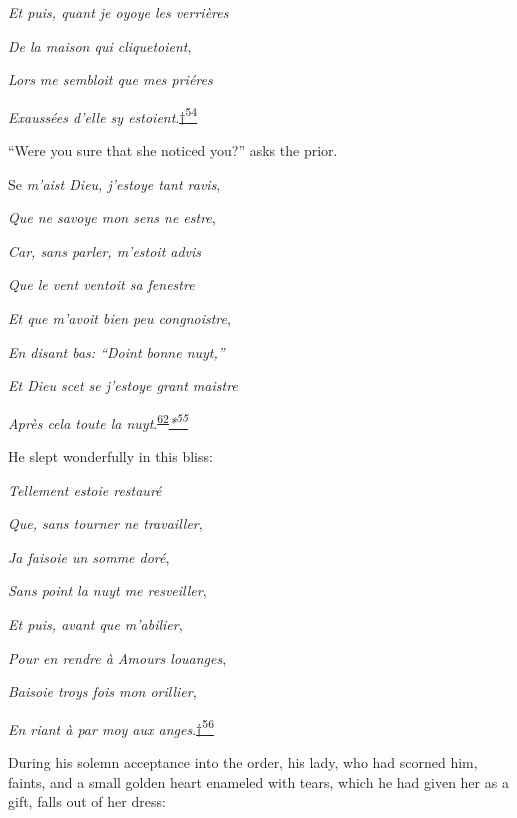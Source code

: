 \emph{Et puis, quant je oyoye les verrières}

\emph{De la maison qui cliquetoient},

\emph{Lors me sembloit que mes priéres}

\emph{Exaussées d'elle sy
estoient}.\protect\hypertarget{21_Chapter_Thirteen__IMAGE_AND_WORD.xhtmlux5cux23id_2845}{\protect\hyperlink{23_NOTES.xhtmlux5cux23id_2846}{†\textsuperscript{54}}}

``Were you sure that she noticed you?'' asks the prior.

Se \emph{m'aist Dieu, j'estoye tant ravis},

\emph{Que ne savoye mon sens ne estre},

\emph{Car, sans parler, m'estoit advis}

\emph{Que le vent ventoit sa fenestre}

\emph{Et que m'avoit bien peu congnoistre},

\emph{En disant bas: ``Doint bonne nuyt,''}

\emph{\protect\hypertarget{21_Chapter_Thirteen__IMAGE_AND_WORD.xhtmlux5cux23page_371}{}{}Et
Dieu scet se j'estoye grant maistre}

\emph{Après cela toute la
nuyt}.\textsuperscript{\protect\hypertarget{21_Chapter_Thirteen__IMAGE_AND_WORD.xhtmlux5cux23id_188}{\protect\hyperlink{23_NOTES.xhtmlux5cux23id_189}{62}}}\emph{\protect\hypertarget{21_Chapter_Thirteen__IMAGE_AND_WORD.xhtmlux5cux23id_2843}{\protect\hyperlink{23_NOTES.xhtmlux5cux23id_2844}{*\textsuperscript{55}}}}

He slept wonderfully in this bliss:

\emph{Tellement estoie restauré}

\emph{Que, sans tourner ne travailler},

\emph{Ja faisoie un somme doré},

\emph{Sans point la nuyt me resveiller},

\emph{Et puis, avant que m'abilier},

\emph{Pour en rendre à Amours louanges},

\emph{Baisoie troys fois mon orillier},

\emph{En riant à par moy aux
anges}.\protect\hypertarget{21_Chapter_Thirteen__IMAGE_AND_WORD.xhtmlux5cux23id_2841}{\protect\hyperlink{23_NOTES.xhtmlux5cux23id_2842}{†\textsuperscript{56}}}

During his solemn acceptance into the order, his lady, who had scorned
him, faints, and a small golden heart enameled with tears, which he had
given her as a gift, falls out of her dress:

